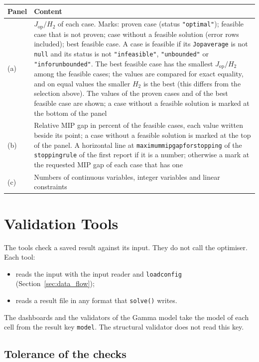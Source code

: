 \documentclass[11pt,a4paper]{article}
\makeatletter
\theoremstyle{plain}
\theoremstyle{definition}
\renewcommand{\_}{\textunderscore\allowbreak{}}
\providecommand{\rejrow}[2]{{\raggedright #1\par} & {\raggedright #2\par} \\}
\providecommand{\tabstart}[2]{\begingroup\small\begin{longtable}{@{}#1@{}}\toprule #2 \\ \midrule \endhead}
\providecommand{\tabend}{\bottomrule\end{longtable}\endgroup}
\makeatother
\begin{document}
\tabstart{p{1.6cm}p{13.4cm}}{Panel & Content}
\rejrow{(a)}{$J_{\mathrm{op}}/H_2$ of each case. Marks: proven case (status \texttt{"optimal"}); feasible case that is not proven; case without a feasible solution (error rows included); best feasible case. A case is feasible if its \texttt{J\_op\_average} is not \texttt{null} and its status is not \texttt{"infeasible"}, \texttt{"unbounded"} or \texttt{"inf\_or\_unbounded"}. The best feasible case has the smallest $J_{\mathrm{op}}/H_2$ among the feasible cases; the values are compared for exact equality, and on equal values the smaller $H_2$ is the best (this differs from the selection above). The values of the proven cases and of the best feasible case are shown; a case without a feasible solution is marked at the bottom of the panel}
\rejrow{(b)}{Relative MIP gap in percent of the feasible cases, each value written beside its point; a case without a feasible solution is marked at the top of the panel. A horizontal line at \texttt{maximum\_mip\_gap\_for\_stopping} of the \texttt{stopping\_rule} of the first report if it is a number; otherwise a mark at the requested MIP gap of each case that has one}
\rejrow{(c)}{Numbers of continuous variables, integer variables and linear constraints}
\tabend

\section{Validation Tools}
\label{sec:validation}

The tools check a saved result against its input. They do not call the optimiser. Each tool:
\begin{itemize}[nosep]
  \item reads the input with the input reader and \texttt{load\_config} (Section~\ref{sec:data_flow});
  \item reads a result file in any format that \texttt{solve()} writes.
\end{itemize}
The dashboards and the validators of the Gamma model take the model of each cell from the result key \texttt{model}. The structural validator does not read this key.

\subsection{Tolerance of the checks}
\label{sec:validation_tolerance}
\end{document}
